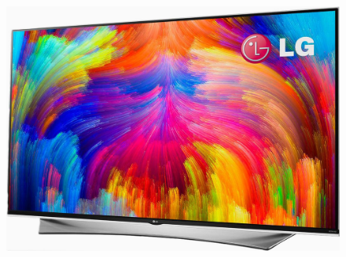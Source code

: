 \documentclass[aspectratio=169]{beamer}
\begin{document}
\begin{frame}
\begin{columns}
    \begin{column}{0.25\textwidth}
      \begin{figure}
        \includegraphics[width=\textwidth]{figures/devices/quantum_dot_tv.jpg}
      \end{figure}
    \end{column}


\end{columns}
\end{frame}
\end{document}
